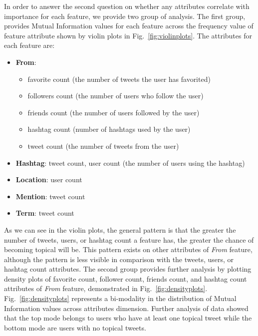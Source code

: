 In order to answer the second question on whether any attributes correlate with importance for each feature, we provide two group of analysis. The first group, provides Mutual Information values for each feature across the frequency value of feature attribute shown by violin plots in Fig.~\ref{fig:violinplots}. The attributes for each feature are:

\begin{itemize}
\item \textbf{From}: 
\begin{itemize}
\item favorite count (the number of tweets the user has favorited)
\item followers count (the number of users who follow the user)
\item friends count (the number of users followed by the user)
\item hashtag count (number of hashtags used by the user)
\item tweet count (the number of tweets from the user)
 \end{itemize}
\item \textbf{Hashtag}: tweet count, user count (the number of users using the hashtag)
\item \textbf{Location}: user count
\item \textbf{Mention}: tweet count
\item \textbf{Term}: tweet count
\end{itemize}

As we can see in the violin plots, the general pattern is that the greater the number of tweets, users, or hashtag count a feature has, the greater the chance of becoming topical will be. This pattern exists on other attributes of \textit{From} feature, although the pattern is less visible in comparison with the tweets, users, or hashtag count attributes. 
The second group provides further analysis by plotting density plots of favorite count, follower count, friends count, and hashtag count attributes of \textit{From} feature, demonstrated in Fig.~\ref{fig:densityplots}. Fig.~\ref{fig:densityplots} represents a bi-modality in the distribution of Mutual Information values across attributes dimension. Further analysis of data showed that the top mode belongs to users who have at least one topical tweet while the bottom mode are users with no topical tweets.


